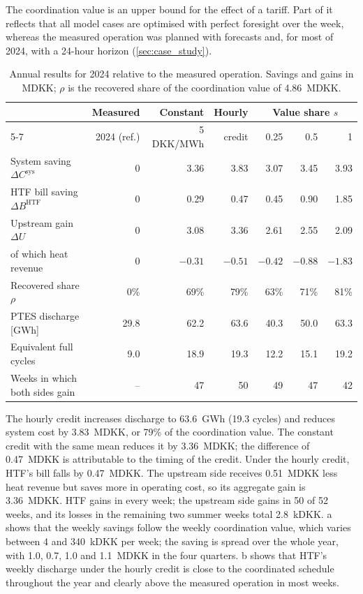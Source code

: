The coordination value is an upper bound for the effect of a tariff. Part of it reflects that all model cases are optimised with perfect foresight over the week, whereas the measured operation was planned with forecasts and, for most of 2024, with a 24-hour horizon (\cref{sec:case_study}).

\begin{table}[!htb]
    \centering
    \small
    \caption{Annual results for 2024 relative to the measured operation. Savings and gains in MDKK; $\rho$ is the recovered share of the coordination value of 4.86~MDKK.}
    \label{tab:annual-results}
    \begin{tabular}{lrrrrrr}
        \toprule
        & Measured & Constant & Hourly & \multicolumn{3}{c}{Value share $s$} \\
        \cmidrule(lr){5-7}
        & 2024 (ref.) & 5 DKK/MWh & credit & 0.25 & 0.5 & 1 \\
        \midrule
        System saving $\Delta C^{\mathrm{sys}}$ & 0 & 3.36 & 3.83 & 3.07 & 3.45 & 3.93 \\
        HTF bill saving $\Delta B^{\mathrm{HTF}}$ & 0 & 0.29 & 0.47 & 0.45 & 0.90 & 1.85 \\
        Upstream gain $\Delta U$ & 0 & 3.08 & 3.36 & 2.61 & 2.55 & 2.09 \\
        \quad of which heat revenue & 0 & $-0.31$ & $-0.51$ & $-0.42$ & $-0.88$ & $-1.83$ \\
        Recovered share $\rho$ & 0\% & 69\% & 79\% & 63\% & 71\% & 81\% \\
        PTES discharge [GWh] & 29.8 & 62.2 & 63.6 & 40.3 & 50.0 & 63.3 \\
        Equivalent full cycles & 9.0 & 18.9 & 19.3 & 12.2 & 15.1 & 19.2 \\
        Weeks in which both sides gain & -- & 47 & 50 & 49 & 47 & 42 \\
        \bottomrule
    \end{tabular}
\end{table}

The hourly credit increases discharge to 63.6~GWh (19.3 cycles) and reduces system cost by 3.83~MDKK, or 79\% of the coordination value. The constant credit with the same mean reduces it by 3.36~MDKK; the difference of 0.47~MDKK is attributable to the timing of the credit. Under the hourly credit, HTF's bill falls by 0.47~MDKK. The upstream side receives 0.51~MDKK less heat revenue but saves more in operating cost, so its aggregate gain is 3.36~MDKK. HTF gains in every week; the upstream side gains in 50 of 52 weeks, and its losses in the remaining two summer weeks total 2.8~kDKK. a shows that the weekly savings follow the weekly coordination value, which varies between 4 and 340~kDKK per week; the saving is spread over the whole year, with 1.0, 0.7, 1.0 and 1.1~MDKK in the four quarters. b shows that HTF's weekly discharge under the hourly credit is close to the coordinated schedule throughout the year and clearly above the measured operation in most weeks.

